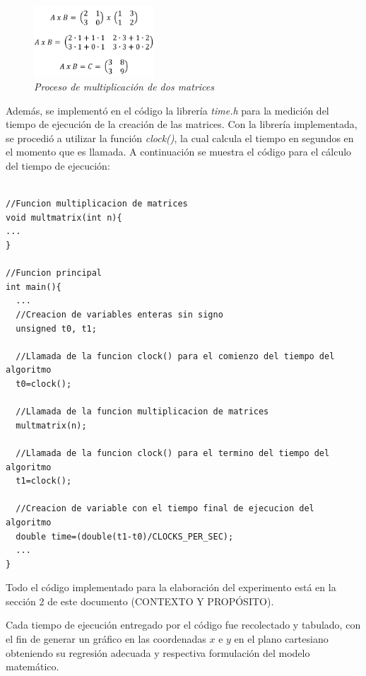 \documentclass[11pt, twocolumn]{llncs}
\begin{document}
\begin{figure}
\caption{\textit{\label{fig:multiplicacion}Proceso de multiplicación de dos matrices}}
\centering
\includegraphics[width=0.4\textwidth]{imagenes/multiplicacion.png}
\end{figure}

Además, se implementó en el código la librería \textit{time.h} para la medición del tiempo de ejecución de la creación de las matrices. Con la librería implementada, se procedió a utilizar la función \textit{clock()}, la cual calcula el tiempo en segundos en el momento que es llamada. A continuación se muestra el código para el cálculo del tiempo de ejecución:



\lstset{language=, breaklines=true, basicstyle=\footnotesize}
\begin{lstlisting}[frame=single]

//Funcion multiplicacion de matrices
void multmatrix(int n){
...
}

//Funcion principal
int main(){
  ...
  //Creacion de variables enteras sin signo
  unsigned t0, t1;
  
  //Llamada de la funcion clock() para el comienzo del tiempo del algoritmo
  t0=clock();
  
  //Llamada de la funcion multiplicacion de matrices
  multmatrix(n);
  
  //Llamada de la funcion clock() para el termino del tiempo del algoritmo
  t1=clock();
  
  //Creacion de variable con el tiempo final de ejecucion del algoritmo
  double time=(double(t1-t0)/CLOCKS_PER_SEC);
  ...
}

\end{lstlisting}

Todo el código implementado para la elaboración del experimento está en la sección 2 de este documento (CONTEXTO Y PROPÓSITO).

Cada tiempo de ejecución entregado por el código fue recolectado y tabulado, con el fin de generar un gráfico en las coordenadas $x$ e $y$ en el plano cartesiano obteniendo su regresión adecuada y respectiva formulación del modelo matemático.
\end{document}
